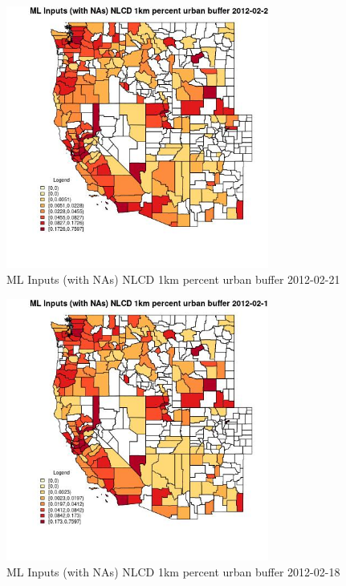 \begin{figure} 
\centering  
\includegraphics[width=0.77\textwidth]{Code_Outputs/Report_ML_input_PM25_Step4_part_f_de_duplicated_aves_prioritize_24hr_obswNAs_CountyNLCD_1km_percent_urban_bufferMean2012-02-21.jpg} 
\caption{\label{fig:Report_ML_input_PM25_Step4_part_f_de_duplicated_aves_prioritize_24hr_obswNAsCountyNLCD_1km_percent_urban_bufferMean2012-02-21}ML Inputs (with NAs) NLCD 1km percent urban buffer 2012-02-21} 
\end{figure} 
 

\begin{figure} 
\centering  
\includegraphics[width=0.77\textwidth]{Code_Outputs/Report_ML_input_PM25_Step4_part_f_de_duplicated_aves_prioritize_24hr_obswNAs_CountyNLCD_1km_percent_urban_bufferMean2012-02-18.jpg} 
\caption{\label{fig:Report_ML_input_PM25_Step4_part_f_de_duplicated_aves_prioritize_24hr_obswNAsCountyNLCD_1km_percent_urban_bufferMean2012-02-18}ML Inputs (with NAs) NLCD 1km percent urban buffer 2012-02-18} 
\end{figure} 
 

